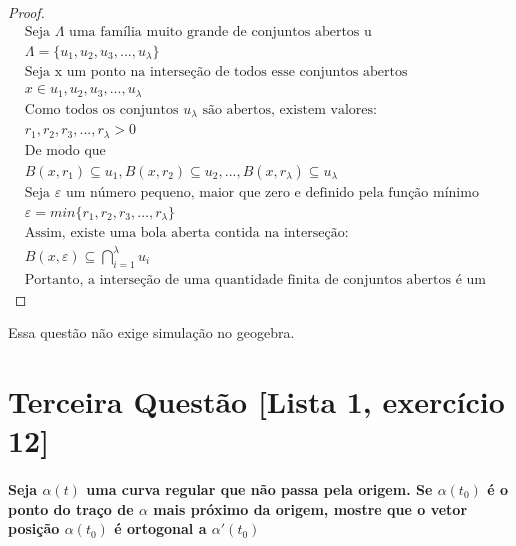 \documentclass[fleqn]{article}
\begin{document}
\begin{proof}
\begin{align*}
 & \text{Seja } \Lambda \text{ uma família muito grande de conjuntos abertos u} \\ 
  &\Lambda = \{ u_{1}, u_{2}, u_{3}, ... , u_{\lambda} \} \\
  & \text{Seja x um ponto na interseção de todos esse conjuntos abertos} \\
  &x \in u_{1}, u_{2}, u_{3}, ... , u_{\lambda } \\
  &\text{Como todos os conjuntos } u_{\lambda} \text{ são abertos, existem valores:} \\
  &r_{1}, r_{2}, r_{3}, ... , r_{\lambda } > 0 \\
  &\text{De modo que } \\
 & B(x, r_{1}) \subseteq u_{1},   
   B(x, r_{2}) \subseteq u_{2}, ..., 
    B(x, r_{\lambda}) \subseteq u_{\lambda}  \\
 & \text{Seja } \varepsilon \text{ um número pequeno, maior que zero e definido pela função mínimo}\\
  &\varepsilon = min \{r_{1}, r_{2}, r_{3}, ... , r_{\lambda } \} \\
  &\text{Assim, existe uma bola aberta contida na interseção: } \\
  &   B(x, \varepsilon) \subseteq  \bigcap^\lambda_{i=1} u_{i}  \\
 & \text{Portanto, a interseção de uma quantidade finita de conjuntos abertos é um conjunto aberto.}
\end{align*}
\end{proof}

\bigskip

Essa questão não exige simulação no geogebra.

\newpage

\section*{Terceira Questão [Lista 1, exercício 12]} 


\paragraph{Seja $\alpha (t)$ uma curva regular que não passa pela origem. Se $\alpha (t_{0})$ é o ponto do traço de $\alpha$ mais próximo da origem, mostre que o vetor posição $\alpha (t_{0})$ é ortogonal a $\alpha'(t_{0})$}
\end{document}
